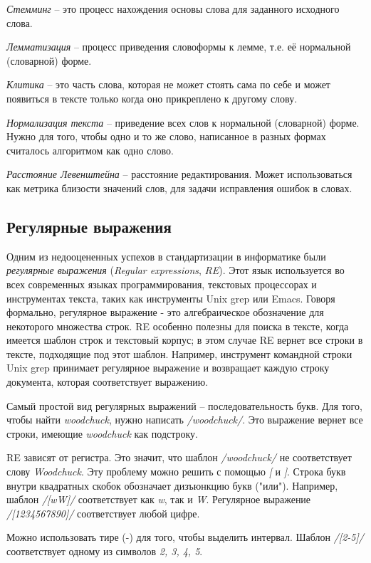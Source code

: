 \documentclass[a4paper,12pt,preview]{report} %
\begin{document}
	\textit{Стемминг} -- это процесс нахождения основы слова для заданного исходного слова. \cite{2}
	
	\textit{Лемматизация} -- процесс приведения словоформы к лемме, т.е. её нормальной (словарной) форме. \cite{3}	
	
	\textit{Клитика} -- это часть слова, которая не может стоять сама по себе и может появиться в тексте только когда оно прикреплено к другому слову. \cite{4}
	
	\textit{Нормализация текста} -- приведение всех слов к нормальной (словарной) форме. Нужно для того, чтобы одно и то же слово, написанное в разных формах считалось алгоритмом как одно слово. 
	
	\textit{Расстояние Левенштейна} -- расстояние редактирования. Может использоваться как метрика близости значений слов, для задачи исправления ошибок в словах.
	
	\subsection{Регулярные выражения}
	Одним из недооцененных успехов в стандартизации в информатике были \textit{регулярные выражения} (\textit{Regular expressions}, \textit{RE}). Этот язык используется во всех современных языках программирования, текстовых процессорах и инструментах текста, таких как инструменты Unix grep или Emacs. Говоря формально, регулярное выражение - это алгебраическое обозначение для некоторого множества строк. RE особенно полезны для поиска в тексте, когда имеется шаблон строк и текстовый корпус; в этом случае RE вернет все строки в тексте, подходящие под этот шаблон.	Например, инструмент командной строки Unix grep принимает регулярное выражение и возвращает каждую строку документа, которая соответствует выражению.
	
	Самый простой вид регулярных выражений -- последовательность букв. Для того, чтобы найти \textit{woodchuck}, нужно написать \textit{/woodchuck/}. Это выражение вернет все строки, имеющие \textit{woodchuck} как подстроку.
	
	RE зависят от регистра. Это значит, что шаблон \textit{/woodchuck/} не соответствует слову \textit{Woodchuck}. Эту проблему можно решить с помощью \textit{[} и \textit{]}. Строка букв внутри квадратных скобок обозначает дизъюнкцию букв ("или"). Например, шаблон \textit{/[wW]/} соответствует как \textit{w}, так и \textit{W}. Регулярное выражение \textit{/[1234567890]/} соответствует любой цифре. 
	
	Можно использовать тире (-) для того, чтобы выделить интервал. Шаблон \textit{/[2-5]/} соответствует одному из символов \textit{2, 3, 4, 5}. 
	
\end{document}
